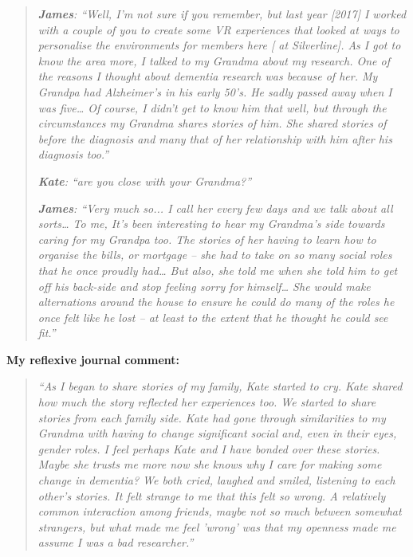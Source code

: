 \begin{quote}
 \textit{   
\textbf{James}: ``Well, I'm not sure if you remember, but last year [2017] I worked with a couple of you to create some VR experiences that looked at ways to personalise the environments for members here [ at Silverline]. As I got to know the area more, I talked to my Grandma about my research. One of the reasons I thought about dementia research was because of her. My Grandpa had Alzheimer's in his early 50's. He sadly passed away when I was five… Of course, I didn't get to know him that well, but through the circumstances my Grandma shares stories of him. She shared stories of before the diagnosis and many that of her relationship with him after his diagnosis too.''}\par


\textit{\textbf{Kate}: ``are you close with your Grandma?''
}\par


\textit{\textbf{James}: ``Very much so... I call her every few days and we talk about all sorts… To me, It's been interesting to hear my Grandma's side towards caring for my Grandpa too. The stories of her having to learn how to organise the bills, or mortgage – she had to take on so many social roles that he once proudly had… But also, she told me when she told him to get off his back-side and stop feeling sorry for himself… She would make alternations around the house to ensure he could do many of the roles he once felt like he lost – at least to the extent that he thought he could see fit.''}
\end{quote}

\textbf{My reflexive journal comment: 
}
\begin{quote}
\textit{``As I began to share stories of my family, Kate started to cry. Kate shared how much the story reflected her experiences too. We started to share stories from each family side. Kate had gone through similarities to my Grandma with having to change significant social and, even in their eyes, gender roles. I feel perhaps Kate and I have bonded over these stories. Maybe she trusts me more now she knows why I care for making some change in dementia? We both cried, laughed and smiled, listening to each other's stories. It felt strange to me that this felt so wrong. A relatively common interaction among friends, maybe not so much between somewhat strangers, but what made me feel 'wrong' was that my openness made me assume I was a bad researcher.''}
\end{quote}


